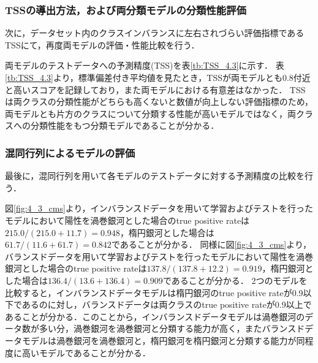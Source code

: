 \documentclass[a4j, 11pt]{jreport}
\begin{document}
\subsubsection{TSSの導出方法，および両分類モデルの分類性能評価}
次に，データセット内のクラスインバランスに左右されづらい評価指標であるTSSにて，再度両モデルの評価・性能比較を行う．


両モデルのテストデータへの予測精度(TSS)を表\ref{tb:TSS_4.3}に示す．
表\ref{tb:TSS_4.3}より，標準偏差付き平均値を見たとき，TSSが両モデルとも0.8付近と高いスコアを記録しており，また両モデルにおける有意差はなかった．
TSSは両クラスの分類性能がどちらも高くないと数値が向上しない評価指標のため，
両モデルとも片方のクラスについて分類する性能が高いモデルではなく，両クラスへの分類性能をもつ分類モデルであることが分かる．

\subsubsection{混同行列によるモデルの評価}
最後に，混同行列を用いて各モデルのテストデータに対する予測精度の比較を行う．

図\ref{fig:4_3_cms}より，インバランスドデータを用いて学習およびテストを行ったモデルにおいて陽性を渦巻銀河とした場合のtrue positive rateは$215.0/(215.0+11.7) = 0.948$，楕円銀河とした場合は$61.7/(11.6+61.7) = 0.842$であることが分かる．
同様に図\ref{fig:4_3_cms}より，バランスドデータを用いて学習およびテストを行ったモデルにおいて陽性を渦巻銀河とした場合のtrue positive rateは$137.8/(137.8+12.2) = 0.919$，楕円銀河とした場合は$136.4/(13.6+136.4) = 0.909$であることが分かる．
2つのモデルを比較すると，インバランスドデータモデルは楕円銀河のtrue positive rateが0.9以下であるのに対し，バランスドデータは両クラスのtrue positive rateが0.9以上であることが分かる．このことから，インバランスドデータモデルは渦巻銀河のデータ数が多い分，渦巻銀河を渦巻銀河と分類する能力が高く，またバランスドデータモデルは渦巻銀河を渦巻銀河と，楕円銀河を楕円銀河と分類する能力が同程度に高いモデルであることが分かる．

\end{document}
